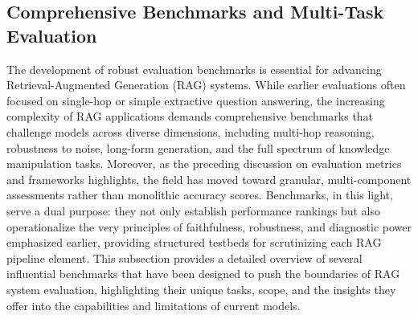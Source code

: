 \documentclass[11pt]{article}
\begin{document}
\subsection{Comprehensive Benchmarks and Multi-Task Evaluation}

The development of robust evaluation benchmarks is essential for advancing Retrieval-Augmented Generation (RAG) systems. While earlier evaluations often focused on single-hop or simple extractive question answering, the increasing complexity of RAG applications demands comprehensive benchmarks that challenge models across diverse dimensions, including multi-hop reasoning, robustness to noise, long-form generation, and the full spectrum of knowledge manipulation tasks. Moreover, as the preceding discussion on evaluation metrics and frameworks highlights, the field has moved toward granular, multi-component assessments rather than monolithic accuracy scores. Benchmarks, in this light, serve a dual purpose: they not only establish performance rankings but also operationalize the very principles of faithfulness, robustness, and diagnostic power emphasized earlier, providing structured testbeds for scrutinizing each RAG pipeline element. This subsection provides a detailed overview of several influential benchmarks that have been designed to push the boundaries of RAG system evaluation, highlighting their unique tasks, scope, and the insights they offer into the capabilities and limitations of current models.
\end{document}
